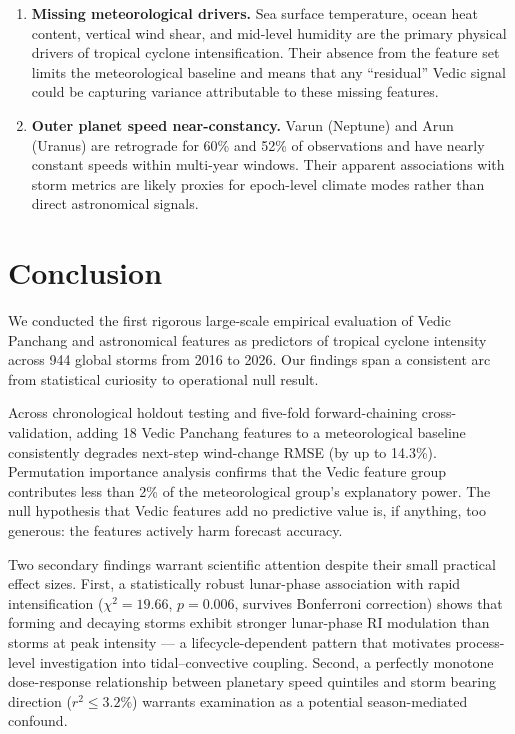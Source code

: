 \documentclass[12pt,a4paper]{article}
\begin{document}
\begin{enumerate}
  \item \textbf{Missing meteorological drivers.}
    Sea surface temperature, ocean heat content, vertical wind shear, and
    mid-level humidity are the primary physical drivers of tropical cyclone
    intensification.
    Their absence from the feature set limits the meteorological baseline and
    means that any ``residual'' Vedic signal could be capturing variance
    attributable to these missing features.

  \item \textbf{Outer planet speed near-constancy.}
    Varun (Neptune) and Arun (Uranus) are retrograde for 60\% and 52\% of
    observations and have nearly constant speeds within multi-year windows.
    Their apparent associations with storm metrics are likely proxies for
    epoch-level climate modes rather than direct astronomical signals.

\end{enumerate}

\section{Conclusion}
\label{sec:conclusion}

We conducted the first rigorous large-scale empirical evaluation of Vedic
Panchang and astronomical features as predictors of tropical cyclone intensity
across 944 global storms from 2016 to 2026.
Our findings span a consistent arc from statistical curiosity to operational
null result.

Across chronological holdout testing and five-fold forward-chaining
cross-validation, adding 18 Vedic Panchang features to a meteorological baseline
consistently degrades next-step wind-change RMSE (by up to 14.3\%).
Permutation importance analysis confirms that the Vedic feature group contributes
less than 2\% of the meteorological group's explanatory power.
The null hypothesis that Vedic features add no predictive value is, if anything,
too generous: the features actively harm forecast accuracy.

Two secondary findings warrant scientific attention despite their small practical
effect sizes.
First, a statistically robust lunar-phase association with rapid intensification
($\chi^2 = 19.66$, $p = 0.006$, survives Bonferroni correction) shows that
forming and decaying storms exhibit stronger lunar-phase RI modulation than
storms at peak intensity — a lifecycle-dependent pattern that motivates
process-level investigation into tidal--convective coupling.
Second, a perfectly monotone dose-response relationship between planetary speed
quintiles and storm bearing direction ($r^2 \leq 3.2\%$) warrants examination as
a potential season-mediated confound.
\end{document}
